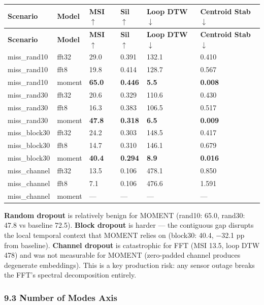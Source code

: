 \documentclass[11pt,a4paper]{article}
\begin{document}
\begin{longtable}{|l|l|l|l|l|l|}
\hline
\textbf{Scenario} & \textbf{Model} & \textbf{MSI $\uparrow$} & \textbf{Sil $\uparrow$} & \textbf{Loop DTW $\downarrow$} & \textbf{Centroid Stab $\downarrow$} \\
\hline
\endfirsthead
\hline
\textbf{Scenario} & \textbf{Model} & \textbf{MSI $\uparrow$} & \textbf{Sil $\uparrow$} & \textbf{Loop DTW $\downarrow$} & \textbf{Centroid Stab $\downarrow$} \\
\hline
\endhead
\hline
\endfoot
miss\_rand10 & fft32 & 29.0 & 0.391 & 132.1 & 0.410 \\
\hline
miss\_rand10 & fft8 & 19.8 & 0.414 & 128.7 & 0.567 \\
\hline
miss\_rand10 & moment & \textbf{65.0} & \textbf{0.446} & \textbf{5.5} & \textbf{0.008} \\
\hline
miss\_rand30 & fft32 & 20.6 & 0.329 & 110.6 & 0.430 \\
\hline
miss\_rand30 & fft8 & 16.3 & 0.383 & 106.5 & 0.517 \\
\hline
miss\_rand30 & moment & \textbf{47.8} & \textbf{0.318} & \textbf{6.5} & \textbf{0.009} \\
\hline
miss\_block30 & fft32 & 24.2 & 0.303 & 148.5 & 0.417 \\
\hline
miss\_block30 & fft8 & 14.7 & 0.310 & 146.1 & 0.679 \\
\hline
miss\_block30 & moment & \textbf{40.4} & \textbf{0.294} & \textbf{8.9} & \textbf{0.016} \\
\hline
miss\_channel & fft32 & 13.5 & 0.106 & 478.1 & 0.850 \\
\hline
miss\_channel & fft8 & 7.1 & 0.106 & 476.6 & 1.591 \\
\hline
miss\_channel & moment & --- & --- & --- & --- \\
\hline
\end{longtable}

\textbf{Random dropout} is relatively benign for MOMENT (rand10: 65.0, rand30: 47.8 vs baseline 72.5).
\textbf{Block dropout} is harder --- the contiguous gap disrupts the local temporal context that MOMENT
relies on (block30: 40.4, $-$32.1 pp from baseline).
\textbf{Channel dropout} is catastrophic for FFT (MSI 13.5, loop DTW 478) and was not measurable for
MOMENT (zero-padded channel produces degenerate embeddings). This is a key production risk: any
sensor outage breaks the FFT's spectral decomposition entirely.

\subsubsection{9.3 Number of Modes Axis}
\end{document}
